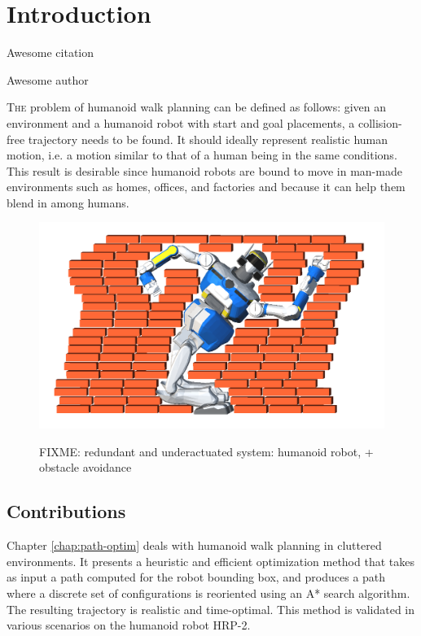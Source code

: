 \chapter{Introduction}\label{chap:chap0}

\epigraph{Awesome citation}{Awesome author}
\clearpage

\lettrine[lines=2, lraise=0., nindent=0em, slope=-.5em]%
{T}{he} problem of humanoid walk planning can be defined as follows:
given an environment and a humanoid robot with start and goal
placements, a collision-free trajectory needs to be found. It should
ideally represent realistic human motion, i.e. a motion similar to
that of a human being in the same conditions. This result is desirable
since humanoid robots are bound to move in man-made environments such
as homes, offices, and factories and because it can help them blend in
among humans.

\begin{figure}
  \centering
      {\includegraphics[width = 0.9\linewidth]
        {src/chap1-path-optimization/hrp2-brick-wall.png}}
      \caption{FIXME: redundant and underactuated system: humanoid
        robot, + obstacle avoidance}
      \label{fig:chap0-hrp2-brick-wall}
\end{figure}

\section[Contributions]{Contributions}

Chapter \autoref{chap:path-optim} deals with humanoid walk planning in
cluttered environments. It presents a heuristic and efficient
optimization method that takes as input a path computed for the robot
bounding box, and produces a path where a discrete set of
configurations is reoriented using an A* search algorithm. The
resulting trajectory is realistic and time-optimal. This method is
validated in various scenarios on the humanoid robot HRP-2.
